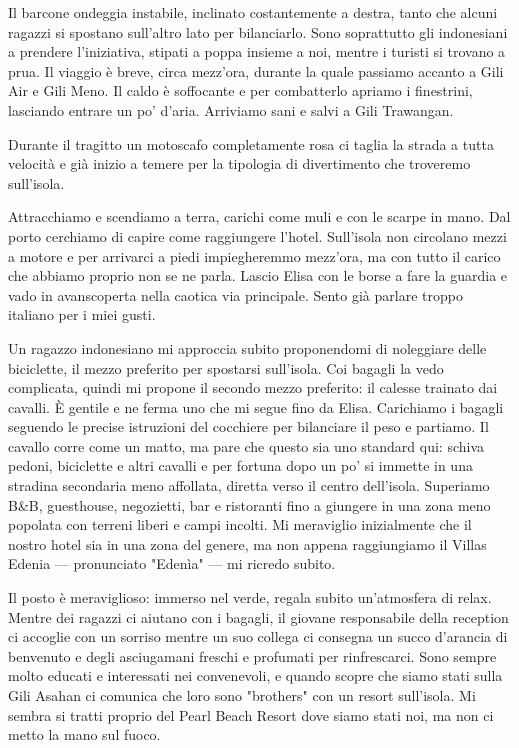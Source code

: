 Il barcone ondeggia instabile, inclinato costantemente a destra, tanto che alcuni ragazzi si spostano sull'altro lato per bilanciarlo. Sono soprattutto gli indonesiani a prendere l'iniziativa, stipati a poppa insieme a noi, mentre i turisti si trovano a prua. Il viaggio è breve, circa mezz'ora, durante la quale passiamo accanto a Gili Air e Gili Meno. Il caldo è soffocante e per combatterlo apriamo i finestrini, lasciando entrare un po' d'aria. Arriviamo sani e salvi a Gili Trawangan.

Durante il tragitto un motoscafo completamente rosa ci taglia la strada a tutta velocità e già inizio a temere per la tipologia di divertimento che troveremo sull'isola.

Attracchiamo e scendiamo a terra, carichi come muli e con le scarpe in mano. Dal porto cerchiamo di capire come raggiungere l'hotel. Sull'isola non circolano mezzi a motore e per arrivarci a piedi impiegheremmo mezz'ora, ma con tutto il carico che abbiamo proprio non se ne parla. Lascio Elisa con le borse a fare la guardia e vado in avanscoperta nella caotica via principale. Sento già parlare troppo italiano per i miei gusti.

Un ragazzo indonesiano mi approccia subito proponendomi di noleggiare delle biciclette, il mezzo preferito per spostarsi sull'isola. Coi bagagli la vedo complicata, quindi mi propone il secondo mezzo preferito: il calesse trainato dai cavalli. È gentile e ne ferma uno che mi segue fino da Elisa. Carichiamo i bagagli seguendo le precise istruzioni del cocchiere per bilanciare il peso e partiamo. Il cavallo corre come un matto, ma pare che questo sia uno standard qui: schiva pedoni, biciclette e altri cavalli e per fortuna dopo un po' si immette in una stradina secondaria meno affollata, diretta verso il centro dell'isola. Superiamo B\&B, guesthouse, negozietti, bar e ristoranti fino a giungere in una zona meno popolata con terreni liberi e campi incolti. Mi meraviglio inizialmente che il nostro hotel sia in una zona del genere, ma non appena raggiungiamo il Villas Edenia — pronunciato "Edenìa" — mi ricredo subito.

Il posto è meraviglioso: immerso nel verde, regala subito un'atmosfera di relax. Mentre dei ragazzi ci aiutano con i bagagli, il giovane responsabile della reception ci accoglie con un sorriso mentre un suo collega ci consegna un succo d'arancia di benvenuto e degli asciugamani freschi e profumati per rinfrescarci. Sono sempre molto educati e interessati nei convenevoli, e quando scopre che siamo stati sulla Gili Asahan ci comunica che loro sono "brothers" con un resort sull'isola. Mi sembra si tratti proprio del Pearl Beach Resort dove siamo stati noi, ma non ci metto la mano sul fuoco.

